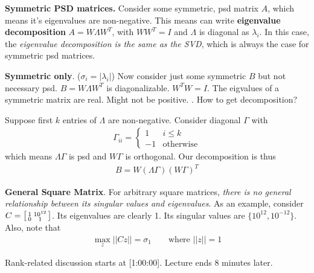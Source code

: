 \documentclass[12pt]{article}
\begin{document}
\begin{compactitem}[$\rightarrow$]
	\item \textbf{Symmetric PSD matrices.} Consider some symmetric, psd matrix $A$, which means it's eigenvalues are non-negative. This means can write \textbf{eigenvalue decomposition} $A = W\Lambda W^T$, with $W W^T = I$ and $\Lambda$ is diagonal as $\lambda_i$. In this case, the \textit{eigenvalue decomposition is the same as the SVD}, which is always the case for symmetric psd matrices. 
	
	\item \textbf{Symmetric only}.  ($\sigma_i = |\lambda_i|$) Now consider just some symmetric $B$ but not necessary psd. $B = W \Lambda W^T$ is diagonalizable. $W^TW = I$. The eigvalues of a symmetric matrix are real. Might not be positive. \purple{[50:00]}. How to get decomposition?
	\begin{compactitem}
		\item Suppose first $k$ entries of $\Lambda$ are non-negative. Consider diagonal $\Gamma$ with 
		\begin{align}
			\Gamma_{ii} = \begin{cases}
				1 & i \le k \\
				-1 & \text{otherwise}
			\end{cases}
		\end{align}
		which means $\Lambda \Gamma$ is psd and $W\Gamma$ is orthogonal. Our decomposition is thus
		\begin{align}
			B = W (\Lambda \Gamma) (W \Gamma)^T 
		\end{align}
	\end{compactitem}
	
	\item \textbf{General Square Matrix}. For arbitrary square matrices, \textit{there is no general relationship between its singular values and eigenvalues}. As an example, consider $C = \begin{bsmallmatrix} 1 & 10^{12} \\ 0 & 1 \end{bsmallmatrix}$. Its eigenvalues are clearly 1. Its singular values are $\{10^{12}, 10^{-12}\}$. Also, note that 
	\begin{align}
		\max_z || C z || = \sigma_1 \qquad \text{where } || z ||  = 1
	\end{align}
	
	\item Rank-related discussion starts at [1:00:00]. Lecture ends 8 minutes later.
\end{compactitem}
\end{document}
